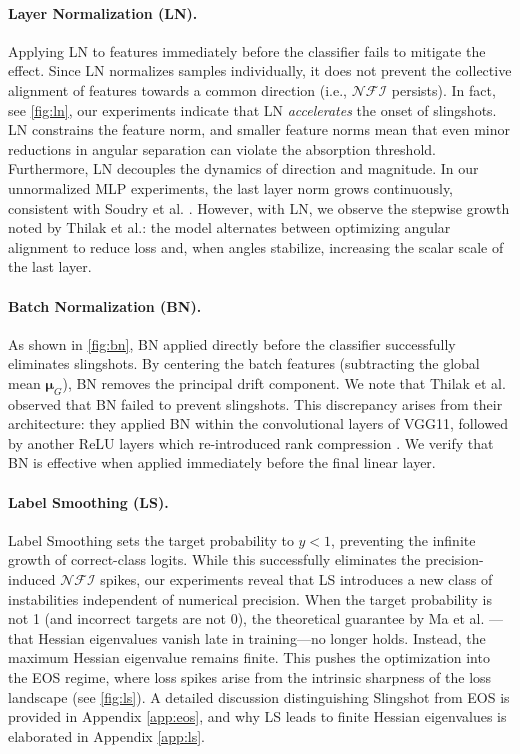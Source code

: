 \documentclass{article}
\theoremstyle{plain}
\theoremstyle{definition}
\theoremstyle{remark}
\begin{document}
\paragraph{Layer Normalization (LN).} 
Applying LN to features immediately before the classifier fails to mitigate the effect. 
Since LN normalizes samples individually, it does not prevent the collective alignment of features towards a common direction (i.e., $\mathcal{NFI}$ persists).
In fact, see \cref{fig:ln}, our experiments indicate that LN \textit{accelerates} the onset of slingshots. 
LN constrains the feature norm, 
and smaller feature norms mean that even minor reductions in angular separation can violate the absorption threshold.
Furthermore, LN decouples the dynamics of direction and magnitude. 
In our unnormalized MLP experiments, the last layer norm grows continuously, consistent with Soudry et al. \cite{soudry2018}. 
However, with LN, we observe the stepwise growth noted by Thilak et al.: 
the model alternates between optimizing angular alignment to reduce loss and, when angles stabilize, increasing the scalar scale of the last layer.

\paragraph{Batch Normalization (BN).} 
As shown in \cref{fig:bn}, BN applied directly before the classifier successfully eliminates slingshots. 
By centering the batch features (subtracting the global mean $\bm{\mu}_G$), BN removes the principal drift component.
We note that Thilak et al. observed that BN failed to prevent slingshots. 
This discrepancy arises from their architecture: they applied BN within the convolutional layers of VGG11, 
followed by another ReLU layers which re-introduced rank compression \cite{daneshmand2020}. 
We verify that BN is effective when applied immediately before the final linear layer.

\paragraph{Label Smoothing (LS).}
Label Smoothing sets the target probability to $y < 1$, preventing the infinite growth of correct-class logits. While this successfully eliminates the precision-induced $\mathcal{NFI}$ spikes, our experiments reveal that LS introduces a new class of instabilities independent of numerical precision.
When the target probability is not 1 (and incorrect targets are not 0), 
the theoretical guarantee by Ma et al. \cite{ma2022}—that Hessian eigenvalues vanish late in training—no longer holds. 
Instead, the maximum Hessian eigenvalue remains finite. 
This pushes the optimization into the EOS regime, 
where loss spikes arise from the intrinsic sharpness of the loss landscape (see \cref{fig:ls}). 
A detailed discussion distinguishing Slingshot from EOS is provided in Appendix \ref{app:eos}, 
and why LS leads to finite Hessian eigenvalues is elaborated in Appendix \ref{app:ls}.
\end{document}

